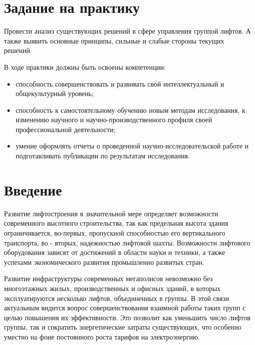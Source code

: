 \section{Задание на практику}
	Провести анализ существующих решений в сфере управления группой лифтов. А также выявить основные принципы, сильные и слабые стороны текущих решений.

	В ходе практики должны быть освоены компетенции:
		\begin{itemize}
			\item способность совершенствовать и развивать свой интеллектуальный и общекультурный уровень;
			\item способность к самостоятельному обучению новым методам исследования, к изменению научного и научно-производственного профиля своей профессиональной деятельности;
			\item умение оформлять отчеты о проведенной научно-исследовательской работе и подготавливать публикации по результатам исследования.
		\end{itemize}

\newpage
\section{Введение}

	Развитие лифтостроения в значительной мере определяет возможности современного высотного строительства,
		так как предельная высота здания ограничивается, во-первых, пропускной способностью его вертикального транспорта,
		во - вторых, надежностью лифтовой шахты. Возможности лифтового оборудования зависят от достижений в области
		науки и техники, а также успехами экономического развития промышленно развитых стран.

	Развитие инфраструктуры современных мегаполисов невозможно без многоэтажных жилых, производственных и офисных зданий,
		в которых эксплуатируются несколько лифтов, объединенных в группы. В этой связи актуальным видится вопрос
		совершенствования взаимной работы таких групп с целью повышения их эффективности.
		Это позволит как уменьшить число лифтов группы, так и сократить энергетические затраты существующих,
		что особенно уместно на фоне постоянного роста тарифов на электроэнергию.
